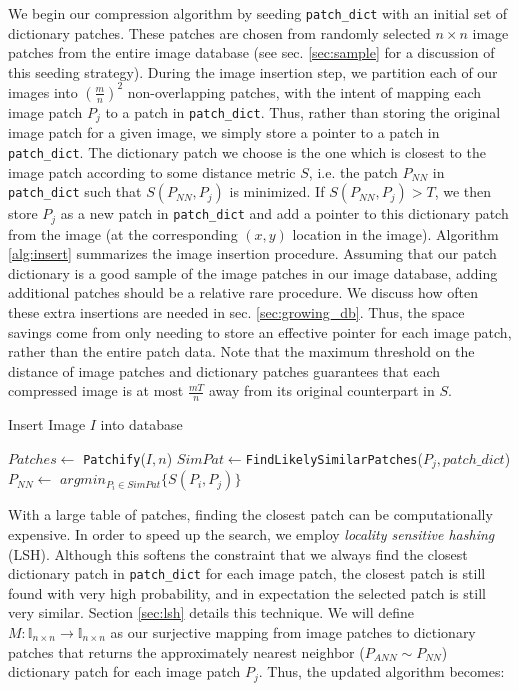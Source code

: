We begin our compression algorithm by seeding \texttt{patch\_dict} with an initial set of dictionary patches.  These patches are chosen from randomly selected $n \times n$ image patches from the entire image database (see sec. \ref{sec:sample} for a discussion of this seeding strategy).   During the image insertion step, we partition each of our images into $\left(\frac{m}{n}\right)^2$ non-overlapping patches, with the intent of mapping each image patch $P_j$ to a patch in \texttt{patch\_dict}.  Thus, rather than storing the original image patch for a given image, we simply store a pointer to a patch in \texttt{patch\_dict}.  The dictionary patch we choose is the one which is closest to the image patch according to some distance metric $S$, i.e. the patch $P_{NN}$ in \texttt{patch\_dict} such that $S(P_{NN}, P_j)$ is minimized.  If $S(P_{NN}, P_j) > T$, we then store $P_j$ as a new patch in \texttt{patch\_dict} and add a pointer to this dictionary patch from the image (at the corresponding $(x,y)$ location in the image).  Algorithm \ref{alg:insert} summarizes the image insertion procedure. Assuming that our patch dictionary is a good sample of the image patches in our image database, adding additional patches should be a relative rare procedure.  We discuss how often these extra insertions are needed in sec. \ref{sec:growing_db}. Thus, the space savings come from only needing to store an effective pointer for each image patch, rather than the entire patch data.  Note that the maximum threshold on the distance of image patches and dictionary patches guarantees that each compressed image is at most $\frac{mT}{n}$ away from its original counterpart in $S$.  

\begin{algorithm}
    \caption{Insert Image $I$ into database}
    \label{alg:insert}
\begin{algorithmic}[1]
\State $Patches \leftarrow $ \texttt{Patchify}($I,n$)
\State $SimPat \leftarrow $\texttt{FindLikelySimilarPatches}($P_j,patch\_dict$)
\State $P_{NN} \leftarrow $ $argmin_{P_i \in SimPat} \{ S(P_i, P_j) \}$
\EndIf
\EndFor
\vspace{3mm}
\end{algorithmic}
\end{algorithm}

With a large table of patches, finding the closest patch can be computationally expensive.  In order to speed up the search, we employ \emph{locality sensitive hashing} (LSH).  Although this softens the constraint that we always find the closest dictionary patch in \texttt{patch\_dict} for each image patch, the closest patch is still found with very high probability, and in expectation the selected patch is still very similar.  Section \ref{sec:lsh} details this technique. We will define $M \colon \mathds{I}_{n \times n}  \to \mathds{I}_{n \times n}$ as our surjective mapping from image patches to dictionary patches that returns the approximately nearest neighbor ($P_{ANN}  \sim P_{NN}$) dictionary patch for each image patch $P_j$. Thus, the updated algorithm becomes: 

